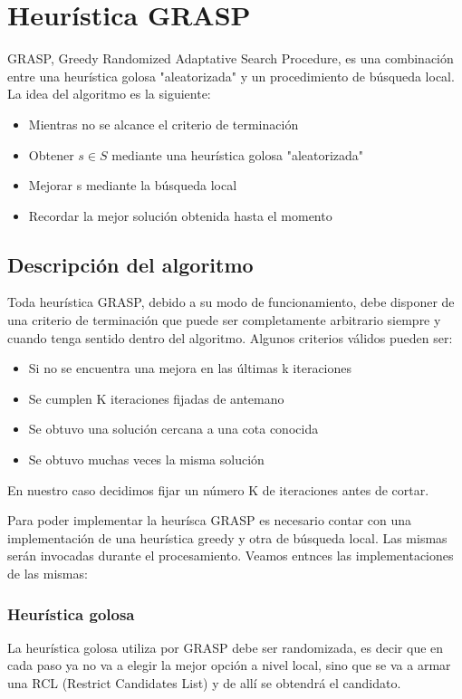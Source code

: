 \section{Heur\'istica GRASP}

GRASP, Greedy Randomized Adaptative Search Procedure, es una combinaci\'on entre una heur\'istica golosa "aleatorizada" y un procedimiento de b\'usqueda local. La idea del algoritmo es la siguiente:

\begin{itemize}
\item Mientras no se alcance el criterio de terminaci\'on
\item Obtener $s \in S$ mediante una heur\'istica golosa "aleatorizada"
\item Mejorar s mediante la b\'usqueda local
\item Recordar la mejor soluci\'on obtenida hasta el momento
\end{itemize}

\subsection{Descripci\'on del algoritmo}

Toda heur\'istica GRASP, debido a su modo de funcionamiento, debe disponer de una criterio de terminaci\'on que puede ser completamente arbitrario siempre y cuando tenga sentido dentro del algoritmo. Algunos criterios v\'alidos pueden ser:

\begin{itemize}
\item Si no se encuentra una mejora en las \'ultimas k iteraciones
\item Se cumplen K iteraciones fijadas de antemano
\item Se obtuvo una soluci\'on cercana a una cota conocida
\item Se obtuvo muchas veces la misma soluci\'on
\end{itemize}

En nuestro caso decidimos fijar un n\'umero K de iteraciones antes de cortar.

Para poder implementar la heur\'isca GRASP es necesario contar con una implementaci\'on de una heur\'istica greedy y otra de b\'usqueda local.
Las mismas ser\'an invocadas durante el procesamiento. Veamos entnces las implementaciones de las mismas:

\subsubsection{Heur\'istica golosa}
La heur\'istica golosa utiliza por GRASP debe ser randomizada, es decir que en cada paso ya no va a elegir la mejor opci\'on a nivel local, sino que se va a armar una RCL (Restrict Candidates List) y de all\'i se obtendr\'a el candidato.

